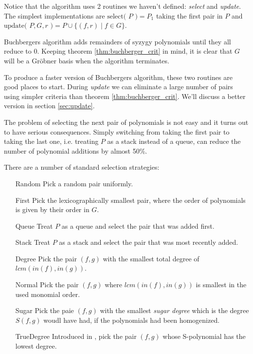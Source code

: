\documentclass{article}
\theoremstyle{changedot}
\theoremstyle{changedotbreak}
\theoremstyle{nonumberplain}
\begin{document}
Notice that the algorithm uses 2 routines we haven't defined: \emph{select} and \emph{update}. The simplest implementations are $\text{select( $P$ )} = P_{1}$ taking the first pair in $P$ and $\text{update( $P, G, r$ )} = P \cup \{(f, r) \mid f \in G\}$.

Buchbergers algorithm adds remainders of syzygy polynomials until they all reduce to 0. Keeping theorem \ref{thm:buchberger_crit} in mind, it is clear that $G$ will be a Gröbner basis when the algorithm terminates.

To produce a faster version of Buchbergers algorithm, these two routines are good places to start. During \emph{update} we can eliminate a large number of pairs using simpler criteria than theorem \ref{thm:buchberger_crit}. We'll discuss a better version in section \ref{sec:update}.

The problem of selecting the next pair of polynomials is not easy and it turns out to have serious consequences. Simply switching from taking the first pair to taking the last one, i.e. treating $P$ as a stack instead of a queue, can reduce the number of polynomial additions by almost 50\%.

There are a number of standard selection strategies:

\begin{itemize}
  \item[Random] Pick a random pair uniformly.

  \item[First] Pick the lexicographically smallest pair, where the order of polynomials is given by their order in $G$.

  \item[Queue] Treat $P$ as a queue and select the pair that was added first.

  \item[Stack] Treat $P$ as a stack and select the pair that was most recently added.

  \item[Degree] Pick the pair $(f, g)$ with the smallest total degree of $lcm(in(f), in(g))$.

  \item[Normal] Pick the pair $(f, g)$ where $lcm(in(f), in(g))$ is smallest in the used monomial order.

  \item[Sugar] Pick the paie $(f, g)$ with the smallest \emph{sugar degree} which is the degree $S(f, g)$ woudl have had, if the polynomials had been homogenized.

  \item[TrueDegree] Introduced in \cite{peifer}, pick the pair $(f, g)$ whose S-polynomial has the lowest degree.
\end{itemize}
\end{document}
